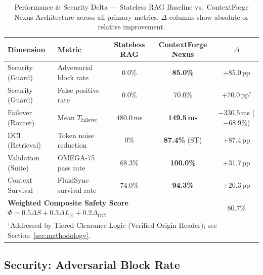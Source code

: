 \documentclass[11pt,twocolumn]{article}
\begin{document}
\begin{table}[t]
  \centering
  \caption{Performance \& Security Delta --- Stateless RAG Baseline vs.\
    ContextForge Nexus Architecture across all primary metrics.
    $\Delta$ columns show absolute or relative improvement.}
  \label{tab:master}
  \begin{tabular*}{\textwidth}{@{\extracolsep{\fill}}llccc}
    \toprule
    \textbf{Dimension} & \textbf{Metric} &
    \textbf{Stateless RAG} & \textbf{ContextForge Nexus} & \textbf{$\Delta$} \\
    \midrule
    Security (Guard)    & Adversarial block rate   & 0.0\%      & \textbf{85.0\%}   & +85.0\,pp \\
    Security (Guard)    & False positive rate       & 0.0\%      & 70.0\%            & +70.0\,pp$^{\dagger}$ \\
    Failover (Router)   & Mean $T_\text{failover}$ & 480.0\,ms  & \textbf{149.5\,ms}& $-330.5$\,ms ($-68.9\%$) \\
    DCI (Retrieval)     & Token noise reduction     & 0\%        & \textbf{87.4\%} (ST) & +87.4\,pp \\
    Validation (Suite)  & OMEGA-75 pass rate        & 68.3\%     & \textbf{100.0\%}  & +31.7\,pp \\
    Context Survival    & FluidSync survival rate   & 74.0\%     & \textbf{94.3\%}   & +20.3\,pp \\
    \midrule
    \multicolumn{4}{l}{\textbf{Weighted Composite Safety Score}
      $\Phi = 0.5\Delta S + 0.3\Delta L_{\%} + 0.2\Delta_\text{DCI}$} &
    $\mathbf{80.7\%}$ \\
    \bottomrule
    \multicolumn{5}{l}{\small $^{\dagger}$Addressed by Tiered Clearance
      Logic (Verified Origin Header); see Section~\ref{sec:methodology}.} \\
  \end{tabular*}
\end{table}

\subsection{Security: Adversarial Block Rate}
\end{document}
